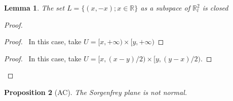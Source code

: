 \documentclass{report}
\newtheorem{lm}{Lemma}[section]
\newtheorem{prop}[lm]{Proposition}
\theoremstyle{definition}
\begin{document}
 \begin{lm}
   \label{lm:closed_sorgenfrey}
  The set $L = \{ (x,-x) ; x \in \mathbb{R} \}$ as a subspace of
      $\mathbb{R}_l^2$ is closed
 \end{lm}

   \begin{proof}
    \begin{proof}
      \pf\ In this case, take $U = [x,+\infty) \times [y, + \infty)$
    \end{proof}
    \begin{proof}
      \pf\ In this case, take $U = [x,(x-y)/2) \times [y,(y-x)/2)$.
    \end{proof}
  \end{proof}

  \begin{prop}[AC]
  The Sorgenfrey plane is not normal.
 \end{prop}
\end{document}
